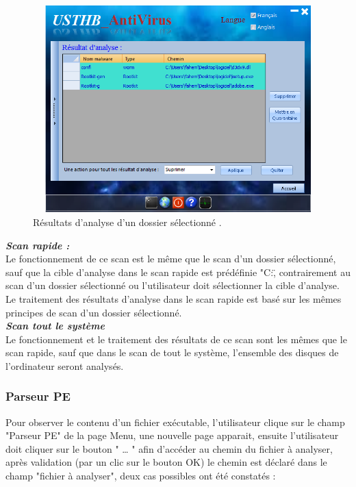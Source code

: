 \begin{figure}[H]
\begin{center}
\includegraphics[width=13cm, height=8cm]{Figures/ant12.png}
\caption{Résultats d'analyse d'un dossier sélectionné .}
\label{fig :ant12} 
\end{center}
\end{figure}
\textit{\textbf{Scan rapide : }}\\

Le fonctionnement de ce scan est le même que le scan d'un dossier sélectionné, sauf que la cible d'analyse dans le scan rapide est prédéfinie "C:\", contrairement au scan d'un dossier sélectionné ou l'utilisateur doit sélectionner la cible d'analyse.\\

        
Le traitement des résultats d'analyse dans le scan rapide est basé sur les mêmes principes de scan d'un dossier sélectionné.\\
\textit{\textbf{Scan tout le système }}\\

Le fonctionnement et le traitement des  résultats de ce scan sont les mêmes que le scan rapide, sauf que dans le scan de tout le système, l'ensemble des disques de l'ordinateur seront analysés.

\subsubsection{Parseur PE}

Pour observer le contenu d'un fichier exécutable, l'utilisateur clique sur le champ "Parseur PE" de la page Menu, une nouvelle page apparait, ensuite l'utilisateur doit cliquer sur le bouton " … "   afin d'accéder au chemin du fichier à analyser, après validation (par un clic sur le bouton OK) le chemin est déclaré dans le champ "fichier à analyser", deux cas possibles ont été constatés :\\

